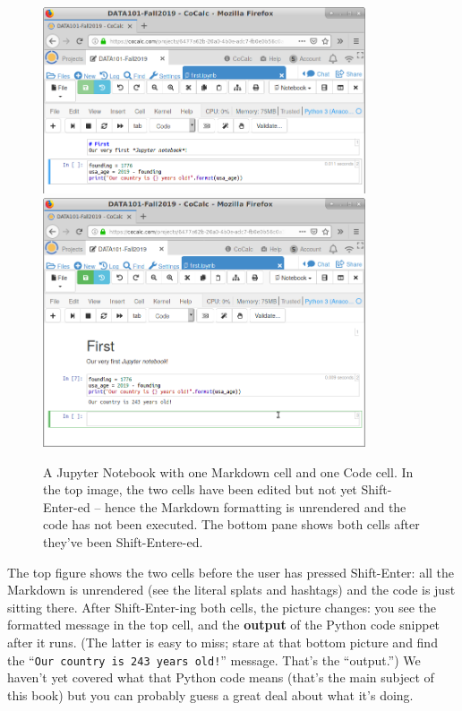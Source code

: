 \begin{figure}[!h]
\centering
\includegraphics[width=0.85\textwidth]{firstNotebook.png} \\
\bigskip
\includegraphics[width=0.85\textwidth]{firstNotebook2.png}
\medskip
\caption{A Jupyter Notebook with one Markdown cell and one Code cell. In the
top image, the two cells have been edited but not yet Shift-Enter-ed -- hence
the Markdown formatting is unrendered and the code has not been executed. The
bottom pane shows both cells after they've been Shift-Entere-ed.}
\label{fig:jupyterNotebook}
\end{figure}

The top figure shows the two cells before the user has pressed Shift-Enter: all
the Markdown is unrendered (see the literal splats and hashtags) and the code
is just sitting there. After Shift-Enter-ing both cells, the picture changes:
you see the formatted message in the top cell, and the \textbf{output} of the
Python code snippet after it runs. (The latter is easy to miss; stare at that
bottom picture and find the ``\texttt{Our country is 243 years old!}'' message.
That's the ``output.'') We haven't yet covered what that Python code means
(that's the main subject of this book) but you can probably guess a great deal
about what it's doing.

